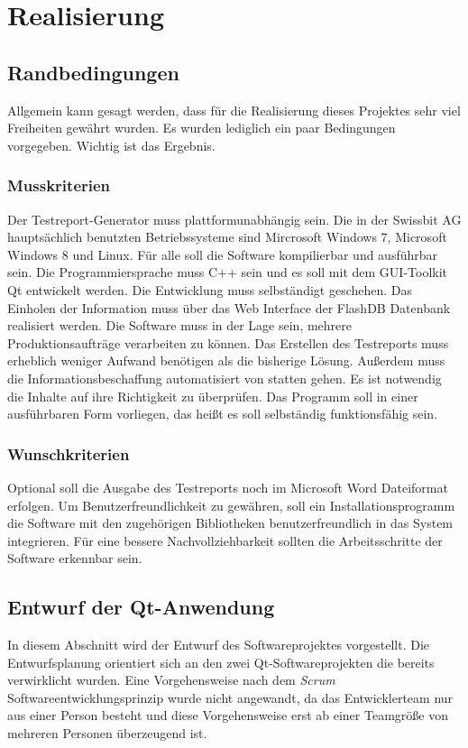 \chapter{Realisierung}

\section{Randbedingungen}
Allgemein kann gesagt werden, dass für die Realisierung dieses Projektes sehr viel Freiheiten gewährt wurden. Es wurden lediglich ein paar Bedingungen vorgegeben. Wichtig ist das Ergebnis.

\subsection{Musskriterien}
Der Testreport-Generator muss plattformunabhängig sein. Die in der Swissbit AG hauptsächlich benutzten Betriebssysteme sind Mircrosoft Windows 7, Microsoft Windows 8 und Linux. Für alle soll die Software kompilierbar und ausführbar sein. Die Programmiersprache muss C++ sein und es soll mit dem GUI-Toolkit Qt entwickelt werden. Die Entwicklung muss selbständigt geschehen. Das Einholen der Information muss über das Web Interface der FlashDB Datenbank realisiert werden. Die Software muss in der Lage sein, mehrere Produktionsaufträge verarbeiten zu können. Das Erstellen des Testreports muss erheblich weniger Aufwand benötigen als die bisherige Lösung. Außerdem muss die Informationsbeschaffung automatisiert von statten gehen. Es ist notwendig die Inhalte auf ihre Richtigkeit zu überprüfen. Das Programm soll in einer ausführbaren Form vorliegen, das heißt es soll selbständig funktionsfähig sein.
	
\subsection{Wunschkriterien}
Optional soll die Ausgabe des Testreports noch im Microsoft Word Dateiformat erfolgen. Um Benutzerfreundlichkeit zu gewähren, soll ein Installationsprogramm die Software mit den zugehörigen Bibliotheken benutzerfreundlich in das System integrieren. Für eine bessere Nachvollziehbarkeit sollten die Arbeitsschritte der Software erkennbar sein.


\section{Entwurf der Qt-Anwendung}
In diesem Abschnitt wird der Entwurf des Softwareprojektes vorgestellt. Die Entwurfsplanung orientiert sich an den zwei Qt-Softwareprojekten die bereits verwirklicht wurden. Eine Vorgehensweise nach dem \textit{Scrum} Softwareentwicklungsprinzip wurde nicht angewandt, da das Entwicklerteam nur aus einer Person besteht und diese Vorgehensweise erst ab einer Teamgröße von mehreren Personen überzeugend ist.
	
